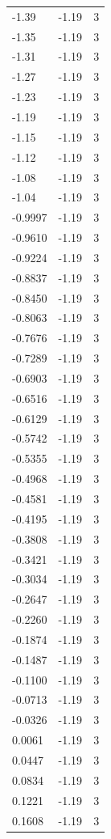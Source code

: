 \begin{longtable}{lrr}
  -1.39 & -1.19 & 3 \\
  -1.35 & -1.19 & 3 \\
  -1.31 & -1.19 & 3 \\
  -1.27 & -1.19 & 3 \\
  -1.23 & -1.19 & 3 \\
  -1.19 & -1.19 & 3 \\
  -1.15 & -1.19 & 3 \\
  -1.12 & -1.19 & 3 \\
  -1.08 & -1.19 & 3 \\
  -1.04 & -1.19 & 3 \\
  -0.9997 & -1.19 & 3 \\
  -0.9610 & -1.19 & 3 \\
  -0.9224 & -1.19 & 3 \\
  -0.8837 & -1.19 & 3 \\
  -0.8450 & -1.19 & 3 \\
  -0.8063 & -1.19 & 3 \\
  -0.7676 & -1.19 & 3 \\
  -0.7289 & -1.19 & 3 \\
  -0.6903 & -1.19 & 3 \\
  -0.6516 & -1.19 & 3 \\
  -0.6129 & -1.19 & 3 \\
  -0.5742 & -1.19 & 3 \\
  -0.5355 & -1.19 & 3 \\
  -0.4968 & -1.19 & 3 \\
  -0.4581 & -1.19 & 3 \\
  -0.4195 & -1.19 & 3 \\
  -0.3808 & -1.19 & 3 \\
  -0.3421 & -1.19 & 3 \\
  -0.3034 & -1.19 & 3 \\
  -0.2647 & -1.19 & 3 \\
  -0.2260 & -1.19 & 3 \\
  -0.1874 & -1.19 & 3 \\
  -0.1487 & -1.19 & 3 \\
  -0.1100 & -1.19 & 3 \\
  -0.0713 & -1.19 & 3 \\
  -0.0326 & -1.19 & 3 \\
  0.0061 & -1.19 & 3 \\
  0.0447 & -1.19 & 3 \\
  0.0834 & -1.19 & 3 \\
  0.1221 & -1.19 & 3 \\
  0.1608 & -1.19 & 3 \\

\end{longtable}
